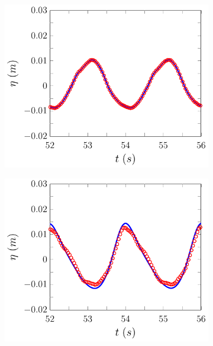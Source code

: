 \begin{figure}
	\centering
	\begin{subfigure}{0.5\textwidth}
		\includegraphics[width=\textwidth]{./chp6/figures/Experiment/Beji/sl/FDVMWG1.pdf}
		\vspace{0.5cm}
	\end{subfigure}%
	\begin{subfigure}{0.5\textwidth}
		\includegraphics[width=\textwidth]{./chp6/figures/Experiment/Beji/sl/FDVMWG2.pdf}
		\vspace{0.5cm}
	\end{subfigure}

\end{figure}
